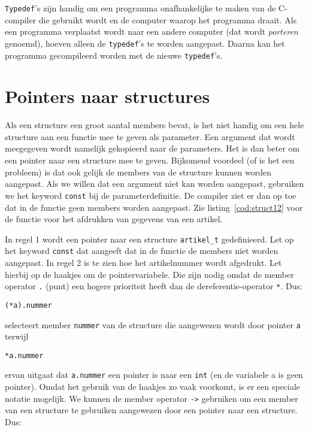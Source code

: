 \texttt{Typedef}'s zijn handig om een programma onafhankelijke te maken van de C-compiler die gebruikt wordt en de computer waarop het programma draait. Als een programma verplaatst wordt naar een andere computer (dat wordt \textsl{porteren} genoemd), hoeven alleen de \texttt{typedef}'s te worden aangepast. Daarna kan het programma gecompileerd worden met de nieuwe \texttt{typedef}'s.

\section{Pointers naar structures}
Als een structure een groot aantal members bevat, is het niet handig om een hele structure aan een functie mee te geven als parameter. Een argument dat wordt meegegeven wordt namelijk gekopieerd naar de parameters. Het is dan beter om een pointer naar een structure mee te geven. Bijkomend voordeel (of is het een probleem) is dat ook gelijk de members van de structure kunnen worden aangepast. Als we willen dat een argument niet kan worden aangepast, gebruiken we het keyword \texttt{const} bij de parameterdefinitie. De compiler ziet er dan op toe dat in de functie geen members worden aangepast. Zie listing~\ref{cod:struct12} voor de functie voor het afdrukken van gegevens van een artikel.


In regel 1 wordt een pointer naar een structure \texttt{artikel\_t} gedefinieerd. Let op het keyword \texttt{const} dat aangeeft dat in de functie de members niet worden aangepast. In regel 2 is te zien hoe het artikelnummer wordt afgedrukt. Let hierbij op de haakjes om de pointervariabele. Die zijn nodig omdat de member operator \texttt{.} (punt) een hogere prioriteit heeft dan de dereferentie-operator \texttt{*}. Dus:

\hspace*{1em}\texttt{(*a).nummer}

selecteert member \texttt{nummer} van de structure die aangewezen wordt door pointer \texttt{a} terwijl

\hspace*{1em}\texttt{*a.nummer}

ervan uitgaat dat \texttt{a.nummer} een pointer is naar een \texttt{int} (en de variabele a is geen pointer).
Omdat het gebruik van de haakjes zo vaak voorkomt, is er een speciale notatie mogelijk. We kunnen de member operator \texttt{->}\indexop{->} gebruiken om een member van een structure te gebruiken aangewezen door een pointer naar een structure. Dus:

